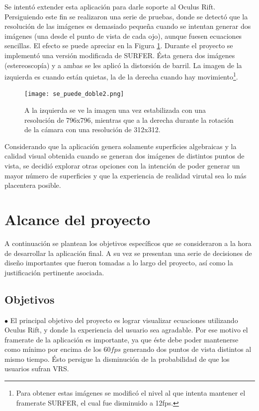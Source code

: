 \documentclass[12pt]{article}
\begin{document}
Se intentó extender esta aplicación para darle soporte al Oculus Rift. Persiguiendo este fin se realizaron una serie de pruebas, donde se detectó que la resolución de las imágenes es demasiado pequeña cuando se intentan generar dos imágenes (una desde el punto de vista de cada ojo), aunque fuesen ecuaciones sencillas. El efecto se puede apreciar en la Figura \ref{malaRES2}. Durante el proyecto se implementó una versión modificada de SURFER. Ésta genera dos imágenes (estereoscopía) y a ambas se les aplicó la distorsión de barril. La imagen de la izquierda es cuando están quietas, la de la derecha cuando hay movimiento\footnote{Para obtener estas imágenes se modificó el nivel al que intenta mantener el framerate SURFER, el cual fue disminuido a 12fps.}.
\clearpage
\begin{figure}[h!]
\texttt{[image: se\_puede\_doble2.png]}
\caption{A la izquierda se ve la imagen una vez estabilizada con una resolución de 796x796, mientras que a la derecha durante la rotación de la cámara con una resolución de 312x312.}
\label{malaRES2}
\end{figure}
Considerando que la aplicación genera solamente superficies algebraicas y la calidad visual obtenida cuando se generan dos imágenes de distintos puntos de vista, se decidió explorar otras opciones con la intención de poder generar un mayor número de superficies y que la experiencia de realidad virutal sea lo más placentera posible.
\clearpage
\null\newpage
\section{Alcance del proyecto}
\noindent A continuación se plantean los objetivos específicos que se consideraron a la hora de desarrollar la aplicación final. A su vez se presentan una serie de decisiones de diseño importantes que fueron tomadas a lo largo del proyecto, así como la justificación pertinente asociada.
\subsection{Objetivos}
$\bullet$ El principal objetivo del proyecto es lograr visualizar ecuaciones utilizando Oculus Rift, y donde  la experiencia del usuario sea agradable. Por ese motivo el framerate de la aplicación es importante, ya que éste debe poder mantenerse como mínimo por encima de los $60 fps$ generando dos puntos de vista distintos al mismo tiempo. Ésto persigue la disminución de la probabilidad de que los usuarios sufran VRS. 
\end{document}
